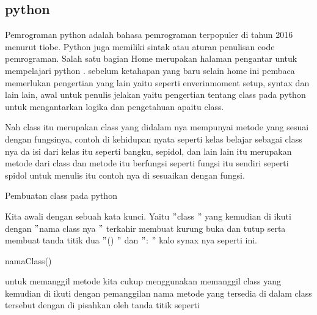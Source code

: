 \subsection{python}
\noindent 
{\fontsize{14pt}{14pt}\selectfont Pemrograman python adalah bahasa pemrograman terpopuler di tahun 2016 menurut tiobe. Python juga memiliki sintak atau aturan penulisan code pemrograman. Salah satu bagian Home merupakan halaman pengantar untuk mempelajari python . sebelum ketahapan yang baru selain home ini pembaca memerlukan pengertian yang lain yaitu seperti enverinmoment setup, syntax dan lain lain, awal untuk penulis jelakan yaitu pengertian tentang class pada python untuk mengantarkan logika dan pengetahuan apaitu class. \\} \par
\vspace{14pt}
\noindent 
{\fontsize{14pt}{14pt}\selectfont Nah class itu merupakan class yang didalam nya mempunyai metode yang sesuai dengan fungsinya, contoh di kehidupan nyata seperti kelas belajar sebagai class nya da isi dari kelas itu seperti bangku, sepidol, dan lain lain itu merupakan metode dari class dan metode itu berfungsi seperti fungsi itu sendiri seperti spidol untuk menulis itu contoh nya di sesuaikan dengan fungsi. \\} \par
\vspace{14pt}
\noindent 
{\fontsize{14pt}{14pt}\selectfont Pembuatan class pada python  \\} \par
\noindent 
{\fontsize{14pt}{14pt}\selectfont Kita awali dengan sebuah kata kunci. Yaitu  $ " $class $ " $ yang kemudian di ikuti dengan  $ " $nama class nya $ " $ terkahir membuat kurung buka dan tutup serta membuat tanda titik dua  $ " $() $ " $ dan  $ " $: $ " $ kalo synax nya seperti ini. \\} \par
\vspace{14pt}
\noindent 
{\fontsize{14pt}{14pt}\selectfont namaClass() \\} \par
\vspace{14pt}
\noindent 
{\fontsize{14pt}{14pt}\selectfont untuk memanggil metode kita cukup menggunakan memanggil class yang kemudian di ikuti dengan pemanggilan nama metode yang tersedia di dalam class tersebut dengan di pisahkan oleh tanda titik seperti \\} \par
\vspace{14pt}

